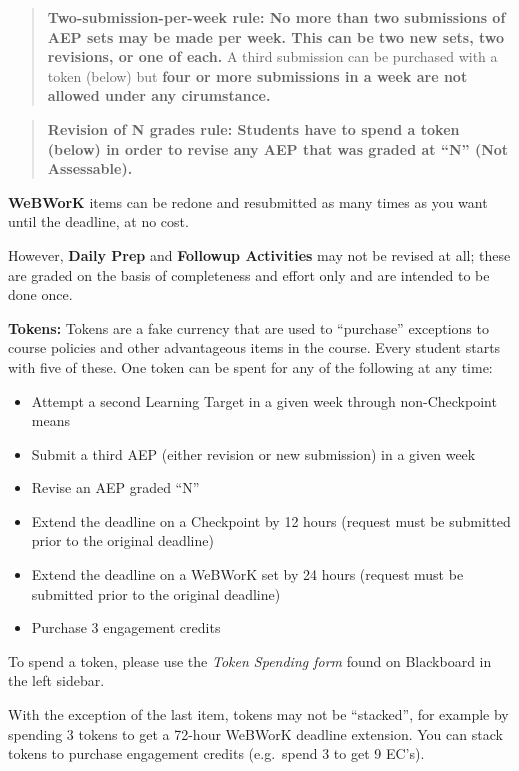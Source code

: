 \documentclass[]{article}
\providecommand{\tightlist}{%
  \setlength{\itemsep}{0pt}\setlength{\parskip}{0pt}}
\begin{document}
\begin{quote}
\textbf{Two-submission-per-week rule: No more than two submissions of
AEP sets may be made per week. This can be two new sets, two revisions,
or one of each.} A third submission can be purchased with a token
(below) but \textbf{four or more submissions in a week are not allowed
under any cirumstance.}
\end{quote}

\begin{quote}
\textbf{Revision of N grades rule: Students have to spend a token
(below) in order to revise any AEP that was graded at ``N'' (Not
Assessable).}
\end{quote}

\textbf{WeBWorK} items can be redone and resubmitted as many times as
you want until the deadline, at no cost.

However, \textbf{Daily Prep} and \textbf{Followup Activities} may not be
revised at all; these are graded on the basis of completeness and effort
only and are intended to be done once.

\textbf{Tokens:} Tokens are a fake currency that are used to ``purchase'' exceptions to
course policies and other advantageous items in the course. Every
student starts with five of these. One token can be spent for any of the
following at any time:

\begin{itemize}
\tightlist
\item
  Attempt a second Learning Target in a given week through
  non-Checkpoint means
\item
  Submit a third AEP (either revision or new submission) in a given week
\item
  Revise an AEP graded ``N''
\item
  Extend the deadline on a Checkpoint by 12 hours (request must be
  submitted prior to the original deadline)
\item
  Extend the deadline on a WeBWorK set by 24 hours (request must be
  submitted prior to the original deadline)
\item
  Purchase 3 engagement credits
\end{itemize}

To spend a token, please use the \emph{Token Spending form} found on
Blackboard in the left sidebar.

With the exception of the last item, tokens may not be ``stacked'', for
example by spending 3 tokens to get a 72-hour WeBWorK deadline
extension. You can stack tokens to purchase engagement credits
(e.g.~spend 3 to get 9 EC's).
\end{document}
